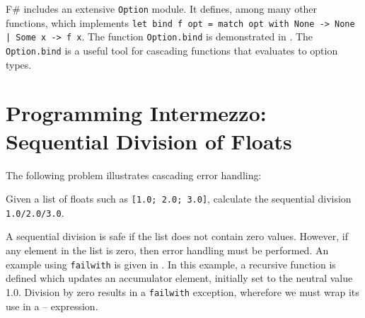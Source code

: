 \documentclass[fsharpNotes.tex]{subfiles}
\begin{document}
F\# includes an extensive \lstinline{Option} module. It defines, among many other functions,  which implements \lstinline{let bind f opt = match opt with None -> None | Some x -> f x}. The function \lstinline{Option.bind} is demonstrated in .
%
%
The \lstinline{Option.bind} is a useful tool for cascading functions that evaluates to option types.

\section{Programming Intermezzo: Sequential Division of Floats}
The following problem illustrates cascading error handling:
\begin{task}
  Given a list of floats such as \lstinline{[1.0; 2.0; 3.0]}, calculate the sequential division \lstinline{1.0/2.0/3.0}. 
\end{task}
A sequential division is safe if the list does not contain zero values. However, if any element in the list is zero, then error handling must be performed. An example using \lstinline{failwith} is given in .
%
%
In this example, a recursive function is defined which updates an accumulator element, initially set to the neutral value 1.0. Division by zero results in a \lstinline{failwith} exception, wherefore we must wrap its use in a -- expression.
\end{document}
